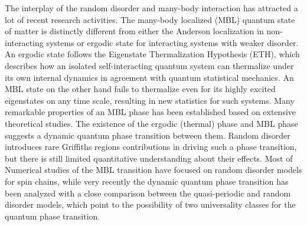 \documentclass[prl,aps,epsf,showpacs,twocolumn]{revtex4}
\begin{document}
The interplay of the random disorder and many-body interaction has attracted a
lot of recent research activities\cite{basko2006, oganesyan2007, pal2010,
znidaric2008, huse2013, nandkishore2015, altman2015, huse2014, nandkishore2014,
pekker_hilbert2014}.
The many-body localized (MBL) quantum state\cite{nandkishore2015, altman2015,
huse2014, nandkishore2014, pekker_hilbert2014} of matter is distinctly different
from either the Anderson localization in non-interacting systems or ergodic
state for interacting systems with weaker disorder.
An ergodic state follows the Eigenstate Thermalization Hypothesis (ETH), which
describes how an isolated self-interacting quantum system can thermalize under
its own internal dynamics in agreement with quantum statistical
mechanics\cite{deutsch1991, srednicki1994, rigol2008}.
An MBL state on the other hand fails to thermalize even for its highly excited
eigenstates on any time scale, resulting in new statistics for such
systems\cite{basko2006, oganesyan2007, pal2010, znidaric2008, huse2013,
  nandkishore2015, altman2015, huse2014, nandkishore2014, pekker_hilbert2014}.
Many remarkable properties of an MBL phase has been
established\cite{nandkishore2015, altman2015, huse2013, nandkishore2014,
  oganesyan2007, pal2010, znidaric2008, rigol2008, serbyn2014, kwasigroch2014,
  yao2014, vasseur2015, huse2014, serbyn2013, ros2015, chandran2014, grover2014,
  agarwal2015, knap2015, luitz2015, devakul2015, torres2015, canovi2011,
  cuevas2012, bauer2013, kjall2014, luca2013, iyer2013, pekker_hilbert2014,
  johri2014, bardarson2012, andraschko2014, laumann2014, hickey2014,
nanduri2014, barlev2014, imbrie2014, groverf2014, ponte2015, huang2015, you2015,
serbyn2015, singh2015, barlev2015, deng2015, chen2015} based on extensive
theoretical studies.
The existence of the ergodic (thermal) phase and MBL phase suggests a dynamic
quantum phase transition between them\cite{basko2006, pal2010, oganesyan2007,
kjall2014, vosk_theory2014, potter2015trans, serbyn2015, agarwal2015, knap2015,
lim2016, zhang2016, zhang2016a, yu2016, vedika2016, dumitrescu2017}.
Random disorder introduces rare Griffiths regions
contributions in driving such a phase transition, but there is still limited
quantitative understanding about their effects. %
Most of Numerical studies of the MBL transition have focused on random disorder
models for spin chains\cite{pal2010, kjall2014, luitz2015, yu2016, vedika2016},
while very recently the dynamic quantum phase transition has been analyzed with
a close comparison between the quasi-periodic and random disorder models, which
point to the possibility of two universality classes for the quantum phase
transition\cite{vedika2017, vedika2016}.
\end{document}
